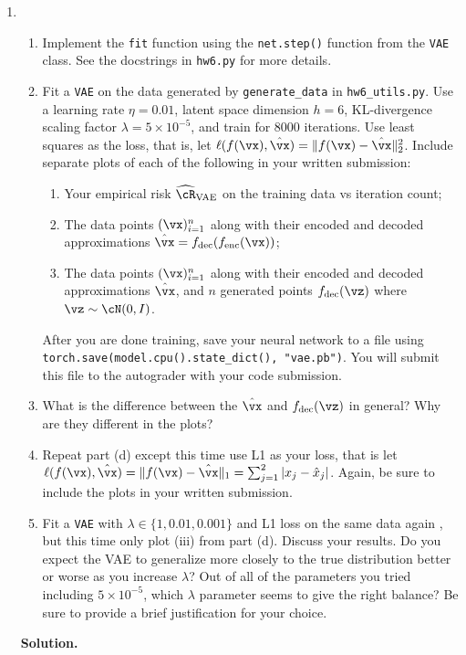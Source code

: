 \documentclass{article}
\def\hcR{\widehat{\cR}}
\theoremstyle{definition}
\theoremstyle{remark}
\newenvironment{Q}
                {%
                    \clearpage
                \item
                    }
                {%
                    \phantom{s}
                  \bigskip
                  \textbf{Solution.}
                }
\begin{document}
\begin{enumerate}
\begin{Q}
\begin{enumerate}
                    \item Implement the \texttt{fit} function using the \texttt{net.step()} function from the \texttt{VAE} class.  See the docstrings in \texttt{hw6.py} for more details.  
                    \item Fit a \texttt{VAE} on the data generated by \texttt{generate\_data} in \texttt{hw6\_utils.py}.  Use a learning rate $\eta = 0.01$, latent space dimension $h = 6$, KL-divergence scaling factor $\lambda = 5 \times 10^{-5}$, and train for 8000 iterations. Use least squares as the loss, that is, let $\ell(f(\vx),\hat\vx) = \Vert f(\vx) - \hat\vx \Vert^2_2$.  Include separate plots of each of the following in your written submission:
                    \begin{enumerate}
                    \item Your empirical risk $\hcR_{\textup{VAE}}$ on the training data vs iteration count;
                    \item The data points $(\vx)_{i=1}^n$ along with their encoded and decoded approximations $\hat \vx =  f_{\textup{dec}} ( f_{\textup{enc}}(\vx))$;
                    \item The data points $(\vx)_{i=1}^n$ along with their encoded and decoded approximations $\hat \vx$, and $n$ generated points $f_{\textup{dec}}(\vz)$ where $\vz \sim \cN ( 0, I)$.
                    \end{enumerate}
                    After you are done training, save your neural network to a file using \texttt{torch.save(model.cpu().state\_dict(), "vae.pb")}. You will submit this file to the autograder with your code submission.
                    \item What is the difference between the $\hat \vx$ and $f_{\textup{dec}}(\vz)$ in general?  Why are they different in the plots?
                    \item Repeat part (d) except this time use L1 as your loss, that is let $\ell(f(\vx),\hat \vx) = \Vert f(\vx) - \hat\vx \Vert_1 = \sum_{j=1}^2 |x_j - \hat x_j|$. Again, be sure to include the plots in your written submission.
                    \item Fit a \texttt{VAE} with $\lambda \in\{1,0.01,0.001\}$ and L1 loss on the same data again , but this time only plot (iii) from part (d).  Discuss your results.  Do you expect the VAE to generalize more closely to the true distribution better or worse as you increase $\lambda$?  Out of all of the parameters you tried including $5 \times 10^{-5}$, which $\lambda$ parameter seems to give the right balance?  Be sure to provide a brief justification for your choice.
                   

\end{enumerate}
\end{Q}
\end{enumerate}
\end{document}
